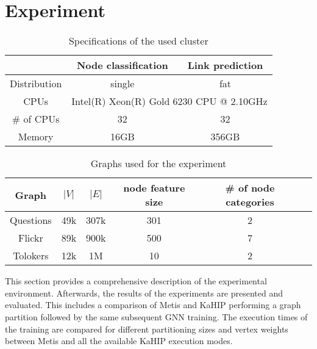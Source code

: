 \documentclass[acmsmall,nonacm,screen,review]{acmart}
\begin{document}
\section{Experiment}
\begin{table}[bt!]
\centering
\begin{tabular}{ ccc }
 \centering
  & Node classification & Link prediction \\ 
 \hline
 Distribution & single & fat \\
 CPUs & \multicolumn{2}{c}{Intel(R) Xeon(R) Gold 6230 CPU @ 2.10GHz} \\ 
 \# of CPUs & 32 & 32 \\ 
 Memory & 16GB & 356GB \\
\end{tabular}
\caption{Specifications of the used cluster}
\label{hw}
\end{table}
\begin{table}[bt!]
\centering
\begin{tabular}{ cccccc }
 \centering
 Graph & $|V|$ & $|E|$ & node feature size & \# of node categories \\ 
 \hline
 Questions \cite{TQ} & 49k & 307k & 301 & 2 \\ 
 Flickr \cite{Flickr} & 89k & 900k & 500 & 7\\ 
 Tolokers \cite{TQ,Tolokers} & 12k & 1M & 10 & 2 \\

\end{tabular}
\caption{Graphs used for the experiment}
\label{graphs}
\end{table}
This section provides a comprehensive description of the experimental environment. Afterwards, the results of the experiments are presented and evaluated. This includes a comparison of Metis and KaHIP performing a graph partition followed by the same subsequent GNN training. The execution times of the training are compared for different partitioning sizes and vertex weights between Metis and all the available KaHIP execution modes. 
\end{document}
